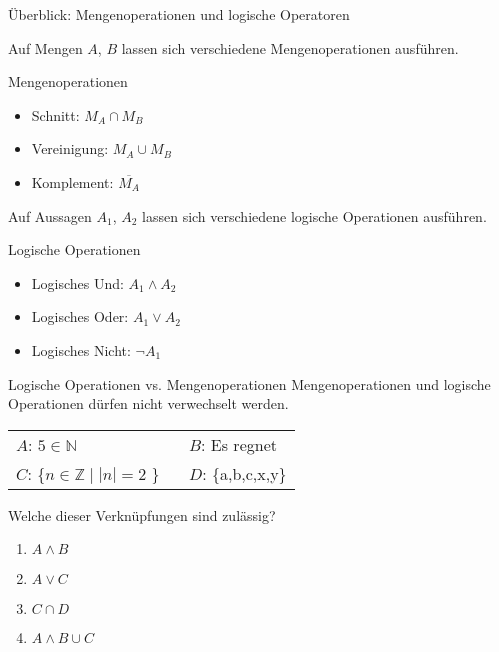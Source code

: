\begin{frame}{Überblick: Mengenoperationen und logische Operatoren}

	{
		\begin{multicols}{2}

			Auf \alert{Mengen} $A$, $B$ lassen sich verschiedene Mengenoperationen ausführen.
			\begin{exampleblock}{Mengenoperationen}
				\begin{itemize}
					\item<2-|alert@2> Schnitt: $M_A \cap M_B$
					\item<3-|alert@3> Vereinigung: $M_A \cup M_B$
					\item<4-|alert@4> Komplement: $\overline{M_A}$
				\end{itemize}
			\end{exampleblock}
			\vfill
			Auf \alert{Aussagen} $A_1$, $A_2$ lassen sich verschiedene logische Operationen ausführen.
			\begin{exampleblock}{Logische Operationen}
				\begin{itemize}
					\item<2-|alert@2> Logisches Und: $A_1 \wedge A_2$
					\item<3-|alert@3> Logisches Oder: $A_1 \vee A_2$
					\item<4-|alert@4> Logisches Nicht: $\neg A_1$
				\end{itemize}
			\end{exampleblock}
		\end{multicols}
	}

\end{frame}

{
\begin{frame}{Logische Operationen vs. Mengenoperationen}
	\alert{Mengenoperationen und logische Operationen dürfen nicht verwechselt werden.}
	\begin{table}[]
		\begin{tabular}{l l}
			$A$: $5 \in \mathbb{N}$                    & $B$: Es regnet     \\
			$C$: \{$n \in \mathbb{Z} \mid |n|=2$ \} \  & $D$: \{a,b,c,x,y\} \\
		\end{tabular}
	\end{table}
	\begin{block}{Welche dieser Verknüpfungen sind zulässig?}
		\begin{enumerate}
			\item $A \wedge B$
			\item $A \vee C$
			\item $C \cap D$
			\item $A \wedge B \cup C$
		\end{enumerate}
	\end{block}
\end{frame}
}

